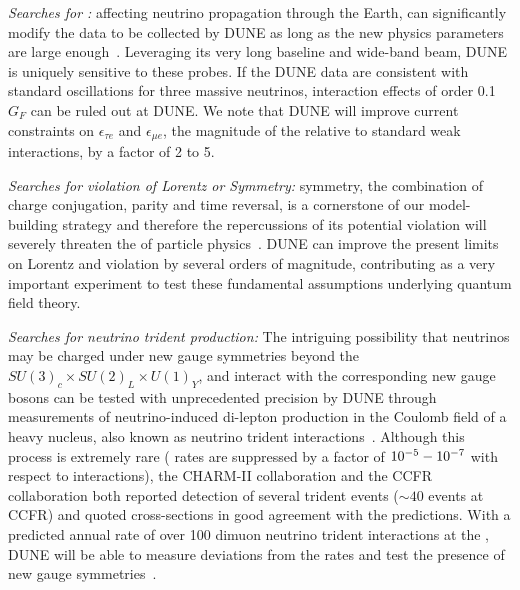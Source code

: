 \textit{Searches for :} %
 affecting neutrino propagation through the Earth, can significantly modify the data to be collected by DUNE as long as the new physics parameters are large enough~\cite{Farzan:2017xzy}. Leveraging its very long baseline and wide-band beam, DUNE is uniquely sensitive to these probes. If the DUNE data are consistent with standard oscillations for three massive neutrinos, interaction effects of order 0.1 $G_{F}$ can be ruled out at DUNE. We note that DUNE will improve current constraints on $\epsilon_{\tau e}$ and $\epsilon_{\mu e}$, the magnitude of the  relative to standard weak interactions, by a factor of 2 to 5.

\textit{Searches for violation of Lorentz or  Symmetry:}  symmetry, the combination of charge conjugation, parity and time reversal, is a cornerstone of our model-building strategy and therefore the repercussions of its potential violation will severely threaten the  of particle physics~\cite{Streater:1989vi,Barenboim:2002tz,Kostelecky:2003cr,Diaz:2009qk,Kostelecky:2011gq,Barenboim:2017ewj}. DUNE can improve the present limits on Lorentz and  violation by several orders of magnitude, contributing as a very important experiment to test these fundamental assumptions underlying quantum field theory.

\textit{Searches for neutrino trident production:} The intriguing possibility that neutrinos may be charged under new gauge symmetries beyond the   $SU(3)_{c} \times SU(2)_{L} \times U(1)_{Y}$, and interact with the corresponding new gauge bosons can be tested with unprecedented precision by DUNE through   measurements of neutrino-induced di-lepton production in the Coulomb field of a heavy nucleus, also known as neutrino trident interactions~\cite{Czyz:1964zz,Lovseth:1971vv,Fujikawa:1971nx,Koike:1971tu,Koike:1971vg,Brown:1973ih,Belusevic:1987cw}. Although this process is extremely rare ( rates are suppressed by a factor of $10^{-5} \-- 10^{-7}$ with respect to  interactions), the CHARM-II collaboration and the CCFR collaboration both reported detection of several trident events ($\sim40$ events at CCFR) and quoted cross-sections in good agreement with the  predictions. With a predicted annual rate of over 100 dimuon neutrino trident interactions at the , DUNE will be able to measure deviations from the  rates and test the presence of new gauge symmetries~\cite{Altmannshofer:2019zhy,Ballett:2018uuc,Ballett:2019xoj}.

